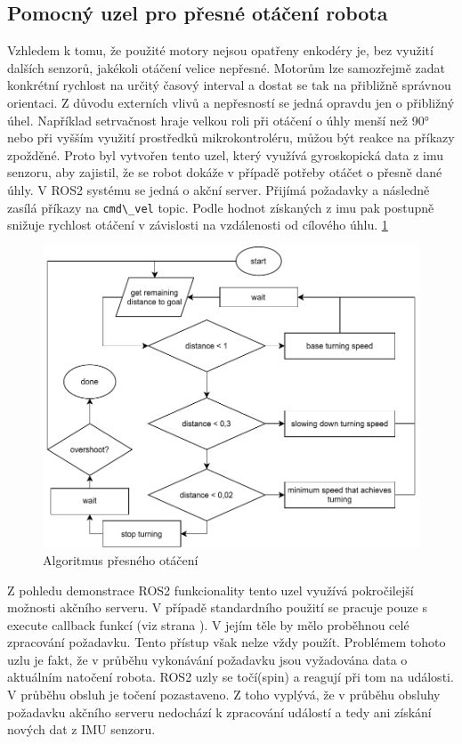 \subsection*{Pomocný uzel pro přesné otáčení robota}
Vzhledem k tomu, že použité motory nejsou opatřeny enkodéry je, bez využití dalších senzorů, jakékoli otáčení velice nepřesné. Motorům lze samozřejmě zadat konkrétní rychlost na určitý časový interval a dostat se tak na přibližně správnou orientaci. Z důvodu externích vlivů a nepřesností se jedná opravdu jen o přibližný úhel. Například setrvačnost hraje velkou roli při otáčení o úhly menší než 90° nebo při vyšším využití prostředků mikrokontroléru, můžou být reakce na příkazy zpožděné.
Proto byl vytvořen tento uzel, který využívá gyroskopická data z imu senzoru, aby zajistil, že se robot dokáže v případě potřeby otáčet o přesně dané úhly. V ROS2 systému se jedná o akční server. Přijímá požadavky a následně zasílá příkazy na \verb|cmd\_vel| topic. Podle hodnot získaných z imu pak postupně snižuje rychlost otáčení v závislosti na vzdálenosti od cílového úhlu. \ref{fig:alg_motor_controller}

\begin{figure}[h!]
	\centering
	\includegraphics[scale=0.75]{obrazky-figures/precise_turning.pdf}
	\caption{Algoritmus přesného otáčení}
	\label{fig:alg_motor_controller}
\end{figure}

Z pohledu demonstrace ROS2 funkcionality tento uzel využívá pokročilejší možnosti akčního serveru. V případě standardního použití se pracuje pouze s execute callback funkcí (viz strana \pageref{theory:action}). V jejím těle by mělo proběhnou celé zpracování požadavku. Tento přístup však nelze vždy použít. Problémem tohoto uzlu je fakt, že v průběhu vykonávání požadavku jsou vyžadována data o aktuálním natočení robota. ROS2 uzly se točí(spin) a reagují při tom na události. V průběhu obsluh je točení pozastaveno. Z toho vyplývá, že v průběhu obsluhy požadavku akčního serveru nedochází k zpracování událostí a tedy ani získání nových dat z IMU senzoru.

